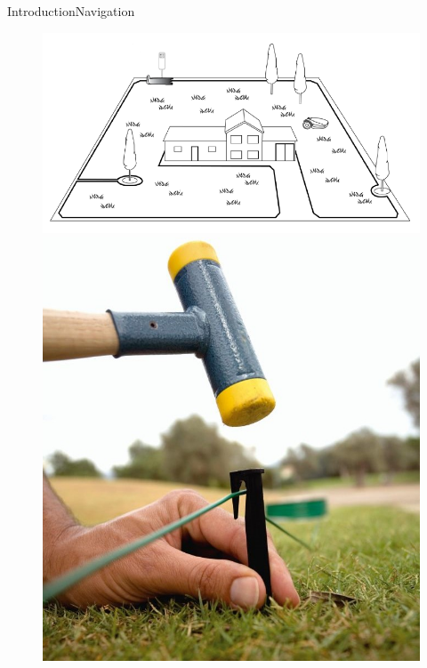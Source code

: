 \begin{frame}{Introduction}{Navigation}
    \begin{figure}[!htb]
    \centering
    \begin{minipage}{.8\textwidth}
        \centering
        \includegraphics[width=0.99\linewidth]{Pictures/robomow.png}
    \end{minipage}%
    \begin{minipage}{0.2\textwidth}
        \centering
        \includegraphics[width=0.99\linewidth]{Pictures/wirehammer.jpg}
    \end{minipage}  
    \end{figure}
\end{frame}

